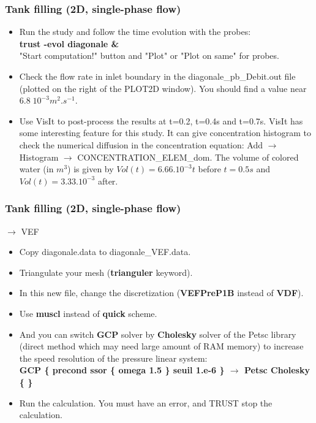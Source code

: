 \documentclass[10pt, hyperref={unicode=true,pdfusetitle, bookmarks=true,bookmarksnumbered=false,bookmarksopen=false, breaklinks=false,pdfborder={0 0 1},backref=true,colorlinks=true,linkcolor=darkblue,pageanchor}]{beamer}
\begin{document}
\begin{frame}
\frametitle{Tank filling (2D, single-phase flow)}
\begin{block}{}

\begin{itemize}
\item Run the study and follow the time evolution with the probes:\\
\textbf{trust -evol diagonale \&} \\
"Start computation!" button and "Plot" or "Plot on same" for probes.
\item Check the flow rate in inlet boundary in the diagonale\_pb\_Debit.out file (plotted on the right of the PLOT2D window). You should find a value near $6.8 \; 10^{-3} m^2.s^{-1}$.
\item Use VisIt to post-process the results at t=0.2, t=0.4s and t=0.7s. VisIt has some interesting feature for this study. It can give concentration histogram to check the numerical diffusion in the concentration equation: Add $\rightarrow$ Histogram $\rightarrow$ CONCENTRATION\_ELEM\_dom.
The volume of colored water (in $m^3$) is given by $Vol(t)= 6.66.10^{-3} t$ before $t=0.5s$ and $Vol(t)=3.33.10^{-3}$ after.
\end{itemize}

\end{block}
\end{frame}
\begin{frame}
\frametitle{Tank filling (2D, single-phase flow)}
\begin{block}{$\rightarrow$ VEF}

\begin{itemize}
\item Copy diagonale.data to diagonale\_VEF.data.
\item Triangulate your mesh (\textbf{trianguler} keyword).
\item In this new file, change the discretization (\textbf{VEFPreP1B} instead of \textbf{VDF}).
\item Use \textbf{muscl} instead of \textbf{quick} scheme.
\item And you can switch \textbf{GCP} solver by \textbf{Cholesky} solver of the Petsc library (direct method which may need large amount of RAM memory) to increase the speed resolution of the pressure linear system:\\
\textbf{GCP \{ precond ssor \{ omega 1.5 \} seuil 1.e-6 \} $\rightarrow$ Petsc Cholesky \{ \}}
\item Run the calculation. You must have an error, and TRUST stop the calculation. 
\end{itemize}

\end{block}
\end{frame}
\end{document}
